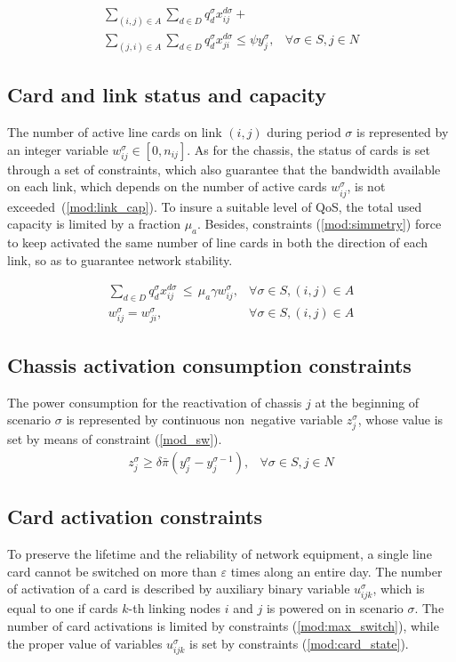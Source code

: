 \documentclass[final,5p,times,twocolumn]{elsarticle}
\begin{document}
\begin{eqnarray}
\label{mod:cap_chass_TON}\sum_{(i,j) \in A}\sum_{d \in D} q_d^{\sigma}x_{ij}^{d \sigma}  + & \nonumber \\
\sum_{(j,i) \in A}\sum_{d \in D}q_d^{\sigma}x_{ji}^{d \sigma} \leq \psi y_{j}^{\sigma}, & \forall \sigma \in S, j \in N 
\end{eqnarray}

\subsection{Card and link status and capacity}
The number of active line cards on link $(i,j)$ during period $\sigma$ is represented by an integer variable $w_{ij}^{\sigma} \in [0,n_{ij}]$. As for the chassis, the status of cards is set through a set of constraints, which also guarantee  that the bandwidth available on each link, which depends on the number of active cards  $w_{ij}^{\sigma}$, is not exceeded~(\ref{mod:link_cap}). To insure a suitable level of QoS, the total used capacity is limited by a fraction $\mu_a$. Besides, constraints  (\ref{mod:simmetry}) force to keep activated the same number of line cards in both the direction of each link, so as to guarantee network stability. 

\begin{eqnarray}
\label{mod:link_cap} \sum_{d \in D} q_d^{\sigma} x_{ij}^{d \sigma}\, \leq\, \mu_a \gamma w_{ij}^{\sigma}, & \forall \sigma \in S, (i,j) \in A \\
\label{mod:simmetry}w_{ij}^\sigma = w_{ji}^\sigma, & \forall \sigma \in S, (i,j) \in A
\end{eqnarray}

\subsection{Chassis activation consumption constraints}
The power consumption for the reactivation of chassis $j$ at the beginning of scenario $\sigma$ is represented by continuous non~negative variable $z_j^{\sigma}$, whose value is set by means of constraint (\ref{mod_sw}).
\begin{eqnarray}
\label{mod_sw} z_{j}^{\sigma} \geq \delta \bar{\pi} \left(y_{j}^{\sigma} - y_{j}^{\sigma-1} \right), &  \forall \sigma \in S, j \in N 
\end{eqnarray}

\subsection{Card activation constraints}
To preserve the lifetime and the reliability of network equipment, a single line card cannot be switched on more than $\varepsilon$ times along an entire day. The number of activation of a card is described by auxiliary binary variable $u_{ijk}^{\sigma}$, which is equal to one if cards $k$-th linking nodes $i$ and $j$ is powered on in scenario $\sigma$. The number of card activations is limited by constraints (\ref{mod:max_switch}), while the proper value of variables $u_{ijk}^{\sigma}$ is set by constraints (\ref{mod:card_state}).
\end{document}
